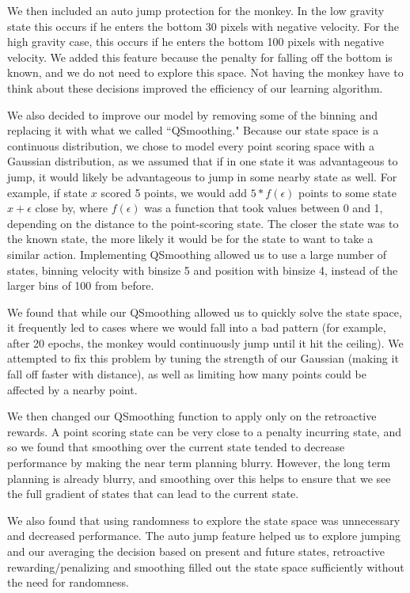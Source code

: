 \documentclass[11pt]{article}
\begin{document}
We then included an auto jump protection for the monkey.  In the low gravity state this occurs if he enters the bottom 30 pixels with negative velocity.  For the high gravity case, this occurs if he enters the bottom 100 pixels with negative velocity.  We added this feature because the penalty for falling off the bottom is known, and we do not need to explore this space.  Not having the monkey have to think about these decisions improved the efficiency of our learning algorithm.

We also decided to improve our model by removing some of the binning and replacing it with what we called ``QSmoothing." Because our state space is a continuous distribution, we chose to model every point scoring space with a Gaussian distribution, as we assumed that if in one state it was advantageous to jump, it would likely be advantageous to jump in some nearby state as well. For example, if state $x$ scored 5 points, we would add $5*f(\epsilon)$ points to some state  $x+\epsilon$ close by, where $f(\epsilon)$ was a function that took values between 0 and 1, depending on the distance to the point-scoring state. The closer the state was to the known state, the more likely it would be for the state to want to take a similar action. Implementing QSmoothing allowed us to use a large number of states, binning velocity with binsize 5 and position with binsize 4, instead of the larger bins of 100 from before.  

We found that while our QSmoothing allowed us to quickly solve the state space, it frequently led to cases where we would fall into a bad pattern (for example, after 20 epochs, the monkey would continuously jump until it hit the ceiling). We attempted to fix this problem by tuning the strength of our Gaussian (making it fall off faster with distance), as well as limiting how many points could be affected by a nearby point. 

We then changed our QSmoothing function to apply only on the retroactive rewards.  A point scoring state can be very close to a penalty incurring state, and  so we found that smoothing over the current state tended to decrease performance by making the near term planning blurry.  However, the long term planning is already blurry, and smoothing over this helps to ensure that we see the full gradient of states that can lead to the current state.


We also found that using randomness to explore the state space was unnecessary and decreased performance.  The auto jump feature helped us to explore jumping and our averaging the decision based on present and future states, retroactive rewarding/penalizing and smoothing filled out the state space sufficiently without the need for randomness.
\end{document}
